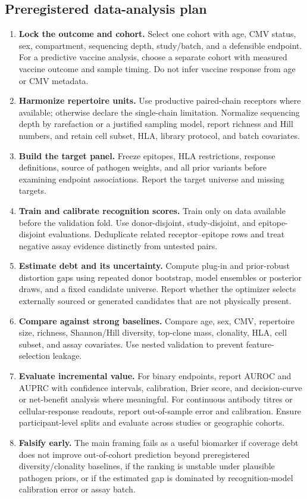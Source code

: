 \documentclass[11pt]{article}
\begin{document}
\subsection{Preregistered data-analysis plan}
\begin{enumerate}
\item \textbf{Lock the outcome and cohort.} Select one cohort with age, CMV status, sex, compartment, sequencing depth, study/batch, and a defensible endpoint. For a predictive vaccine analysis, choose a separate cohort with measured vaccine outcome and sample timing. Do not infer vaccine response from age or CMV metadata.
\item \textbf{Harmonize repertoire units.} Use productive paired-chain receptors where available; otherwise declare the single-chain limitation. Normalize sequencing depth by rarefaction or a justified sampling model, report richness and Hill numbers, and retain cell subset, HLA, library protocol, and batch covariates.
\item \textbf{Build the target panel.} Freeze epitopes, HLA restrictions, response definitions, source of pathogen weights, and all prior variants before examining endpoint associations. Report the target universe and missing targets.
\item \textbf{Train and calibrate recognition scores.} Train only on data available before the validation fold. Use donor-disjoint, study-disjoint, and epitope-disjoint evaluations. Deduplicate related receptor--epitope rows and treat negative assay evidence distinctly from untested pairs.
\item \textbf{Estimate debt and its uncertainty.} Compute plug-in and prior-robust distortion gaps using repeated donor bootstrap, model ensembles or posterior draws, and a fixed candidate universe. Report whether the optimizer selects externally sourced or generated candidates that are not physically present.
\item \textbf{Compare against strong baselines.} Compare age, sex, CMV, repertoire size, richness, Shannon/Hill diversity, top-clone mass, clonality, HLA, cell subset, and assay covariates. Use nested validation to prevent feature-selection leakage.
\item \textbf{Evaluate incremental value.} For binary endpoints, report AUROC and AUPRC with confidence intervals, calibration, Brier score, and decision-curve or net-benefit analysis where meaningful. For continuous antibody titres or cellular-response readouts, report out-of-sample error and calibration. Ensure participant-level splits and evaluate across studies or geographic cohorts.
\item \textbf{Falsify early.} The main framing fails as a useful biomarker if coverage debt does not improve out-of-cohort prediction beyond preregistered diversity/clonality baselines, if the ranking is unstable under plausible pathogen priors, or if the estimated gap is dominated by recognition-model calibration error or assay batch.
\end{enumerate}
\end{document}
